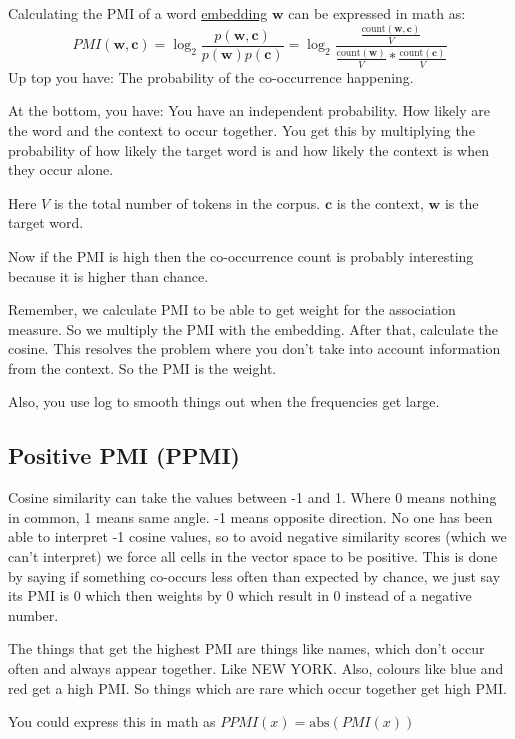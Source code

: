 \documentclass[
  11pt,
  british,
]{article}
\begin{document}
Calculating the PMI of a word \href{Embeddings.md}{embedding}
\(\mathbf{w}\) can be expressed in math as:
\[PMI(\textbf{w},\textbf{c}) = \log_2\frac{p(\textbf{w},\textbf{c})}{p(\textbf{w})p(\textbf{c})} = \log_2\frac{\frac{\text{count}(\textbf{w},\textbf{c})}{V}}{\frac{\text{count}(\textbf{w})}{V}*\frac{\text{count}(\textbf{c})}{V}}\]
Up top you have: The probability of the co-occurrence happening.

At the bottom, you have: You have an independent probability. How likely
are the word and the context to occur together. You get this by
multiplying the probability of how likely the target word is and how
likely the context is when they occur alone.

Here \(V\) is the total number of tokens in the corpus. \(\textbf{c}\)
is the context, \(\textbf{w}\) is the target word.

Now if the PMI is high then the co-occurrence count is probably
interesting because it is higher than chance.

Remember, we calculate PMI to be able to get weight for the association
measure. So we multiply the PMI with the embedding. After that,
calculate the cosine. This resolves the problem where you don't take
into account information from the context. So the PMI is the weight.

Also, you use log to smooth things out when the frequencies get large.

\hypertarget{positive-pmi-ppmi}{%
\subsection{Positive PMI (PPMI)}\label{positive-pmi-ppmi}}

Cosine similarity can take the values between -1 and 1. Where 0 means
nothing in common, 1 means same angle. -1 means opposite direction. No
one has been able to interpret -1 cosine values, so to avoid negative
similarity scores (which we can't interpret) we force all cells in the
vector space to be positive. This is done by saying if something
co-occurs less often than expected by chance, we just say its PMI is 0
which then weights by 0 which result in 0 instead of a negative number.

The things that get the highest PMI are things like names, which don't
occur often and always appear together. Like NEW YORK. Also, colours
like blue and red get a high PMI. So things which are rare which occur
together get high PMI.

You could express this in math as \(PPMI(x) = \text{abs}(PMI(x))\)
\end{document}
